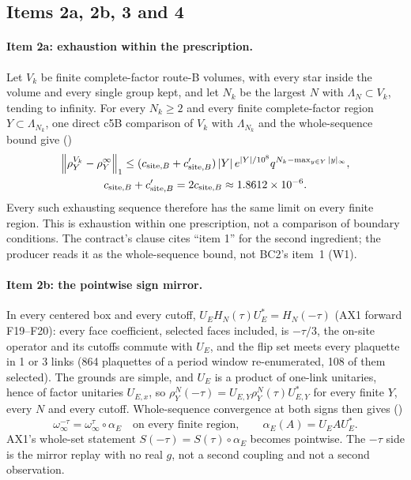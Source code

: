 \subsection{Items 2a, 2b, 3 and 4}
\label{sec:bc2-items}
\paragraph{Item 2a: exhaustion within the prescription.} Let $V_k$ be finite
complete-factor route-B volumes, with every star inside the volume and every
single group kept, and let $N_k$ be the largest $N$ with $\Lambda_N\subset
V_k$, tending to infinity. For every $N_k\ge2$ and every finite
complete-factor region $Y\subset\Lambda_{N_k}$, one direct c5B comparison of
$V_k$ with $\Lambda_{N_k}$ and the whole-sequence bound give
()
\begin{equation}
 \begin{gathered}
 \left\lVert\rho^{V_k}_Y-\rho^\infty_Y\right\rVert_1\le(c_{{\rm site},B}+c'_{{\rm site},B})\,|Y|\,e^{|Y|/10^8}q^{N_k-\max_{y\in Y}|y|_\infty},\\
 c_{{\rm site},B}+c'_{{\rm site},B}=2c_{{\rm site},B}\approx1.8612\times10^{-6}.
 \end{gathered}
 \label{eq:bc2-exhaustion}
\end{equation}
Every such exhausting sequence therefore has the same limit on every finite
region. This is exhaustion within one prescription, not a comparison of
boundary conditions. The contract's clause cites ``item 1'' for the second
ingredient; the producer reads it as the whole-sequence bound, not BC2's
item~1 (W1).

\paragraph{Item 2b: the pointwise sign mirror.} In every centered box and
every cutoff, $U_EH_N(\tau)U_E^*=H_N(-\tau)$ (AX1 forward F19--F20): every face
coefficient, selected faces included, is $-\tau/3$, the on-site operator and
its cutoffs commute with $U_E$, and the flip set meets every plaquette in 1 or
3 links (864 plaquettes of a period window re-enumerated, 108 of them
selected). The grounds are simple, and $U_E$ is a product of one-link
unitaries, hence of factor unitaries $U_{E,x}$, so
$\rho^N_Y(-\tau)=U_{E,Y}\rho^N_Y(\tau)U_{E,Y}^*$ for every finite $Y$, every $N$
and every cutoff. Whole-sequence convergence at both signs then gives
()
\begin{equation}
 \omega^{-\tau}_\infty=\omega^{\tau}_\infty\circ\alpha_E\quad\text{on every finite region},\qquad
 \alpha_E(A)=U_EAU_E^* .
 \label{eq:bc2-mirror}
\end{equation}
AX1's whole-set statement $S(-\tau)=S(\tau)\circ\alpha_E$ becomes pointwise.
The $-\tau$ side is the mirror replay with no real $g$, not a second coupling
and not a second observation.

